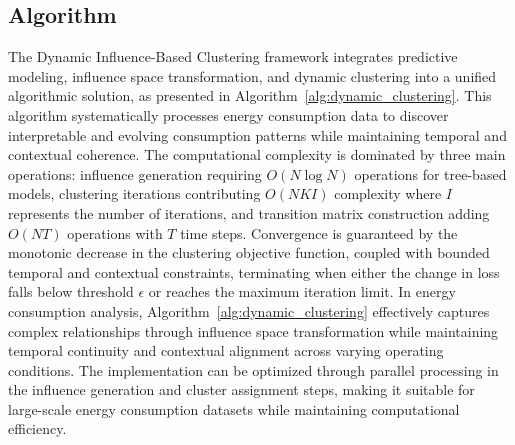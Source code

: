 \documentclass[final,5p,times,twocolumn,numbers]{elsarticle}
\begin{document}
\subsection{Algorithm}
The Dynamic Influence-Based Clustering framework integrates predictive modeling, influence space transformation, and dynamic clustering into a unified algorithmic solution, as presented in Algorithm~\ref{alg:dynamic_clustering}. This algorithm systematically processes energy consumption data to discover interpretable and evolving consumption patterns while maintaining temporal and contextual coherence. The computational complexity is dominated by three main operations: influence generation requiring $O(N\log N)$ operations for tree-based models, clustering iterations contributing $O(NKI)$ complexity where $I$ represents the number of iterations, and transition matrix construction adding $O(NT)$ operations with $T$ time steps. Convergence is guaranteed by the monotonic decrease in the clustering objective function, coupled with bounded temporal and contextual constraints, terminating when either the change in loss falls below threshold $\epsilon$ or reaches the maximum iteration limit. In energy consumption analysis, Algorithm~\ref{alg:dynamic_clustering} effectively captures complex relationships through influence space transformation while maintaining temporal continuity and contextual alignment across varying operating conditions. The implementation can be optimized through parallel processing in the influence generation and cluster assignment steps, making it suitable for large-scale energy consumption datasets while maintaining computational efficiency.
\end{document}
